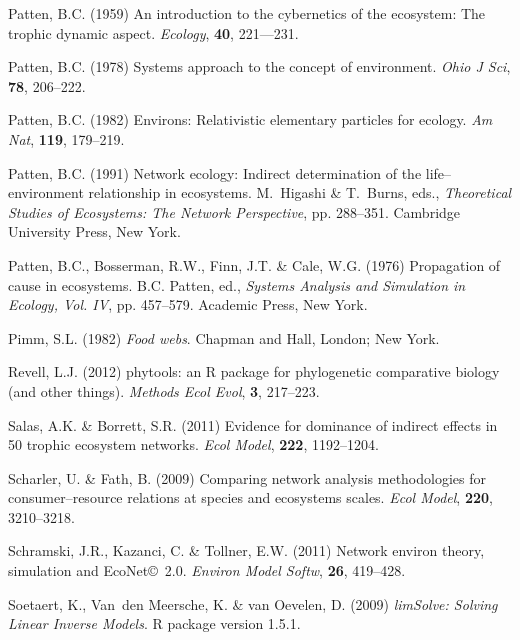 \documentclass[11pt]{article}
\begin{document}
\begin{thebibliography}{79}
Patten, B.C. (1959) An introduction to the cybernetics of the ecosystem: The
  trophic dynamic aspect.
\newblock \emph{Ecology}, \textbf{40}, 221---231.

Patten, B.C. (1978) Systems approach to the concept of environment.
\newblock \emph{Ohio J Sci}, \textbf{78}, 206--222.

Patten, B.C. (1982) Environs: Relativistic elementary particles for ecology.
\newblock \emph{Am Nat}, \textbf{119}, 179--219.

Patten, B.C. (1991) Network ecology: Indirect determination of the
  life--environment relationship in ecosystems.
\newblock M.~Higashi \& T.~Burns, eds., \emph{Theoretical Studies of
  Ecosystems: The Network Perspective}, pp. 288--351. Cambridge University
  Press, New York.

Patten, B.C., Bosserman, R.W., Finn, J.T. \& Cale, W.G. (1976) Propagation of
  cause in ecosystems.
\newblock B.C. Patten, ed., \emph{Systems Analysis and Simulation in Ecology,
  Vol. IV}, pp. 457--579. Academic Press, New York.

Pimm, S.L. (1982) \emph{Food webs}.
\newblock Chapman and Hall, London; New York.

Revell, L.J. (2012) phytools: an {R} package for phylogenetic comparative
  biology (and other things).
\newblock \emph{Methods Ecol Evol}, \textbf{3}, 217--223.

Salas, A.K. \& Borrett, S.R. (2011) Evidence for dominance of indirect effects
  in 50 trophic ecosystem networks.
\newblock \emph{Ecol Model}, \textbf{222}, 1192--1204.

Scharler, U. \& Fath, B. (2009) Comparing network analysis methodologies for
  consumer--resource relations at species and ecosystems scales.
\newblock \emph{Ecol Model}, \textbf{220}, 3210--3218.

Schramski, J.R., Kazanci, C. \& Tollner, E.W. (2011) Network environ theory,
  simulation and {EcoNet}\copyright\ 2.0.
\newblock \emph{Environ Model Softw}, \textbf{26}, 419--428.

Soetaert, K., Van~den Meersche, K. \& van Oevelen, D. (2009) \emph{limSolve:
  Solving Linear Inverse Models}.
\newblock R package version 1.5.1.


\end{thebibliography}
\end{document}
